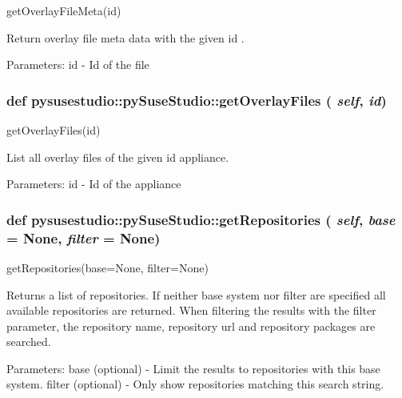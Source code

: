 \label{classpysusestudio_1_1py_suse_studio_a18433f6c2be7dd749e2d7999e28b14f6}
\begin{DoxyVerb}getOverlayFileMeta(id)

        Return overlay file meta data with the given id .
        
            Parameters:
id - Id of the file

\end{DoxyVerb}
 \hypertarget{classpysusestudio_1_1py_suse_studio_a9af6672216c4ce9c3684433b83b19a8e}{
\subsubsection[{getOverlayFiles}]{\setlength{\rightskip}{0pt plus 5cm}def pysusestudio::pySuseStudio::getOverlayFiles ( {\em self}, \/   {\em id})}}
\label{classpysusestudio_1_1py_suse_studio_a9af6672216c4ce9c3684433b83b19a8e}
\begin{DoxyVerb}getOverlayFiles(id)

        List all overlay files of the given id appliance.
        
            Parameters:
id - Id of the appliance

\end{DoxyVerb}
 \hypertarget{classpysusestudio_1_1py_suse_studio_aa9ac2b217553d0e92c065a023ecb159b}{
\subsubsection[{getRepositories}]{\setlength{\rightskip}{0pt plus 5cm}def pysusestudio::pySuseStudio::getRepositories ( {\em self}, \/   {\em base} = {\ttfamily None}, \/   {\em filter} = {\ttfamily None})}}
\label{classpysusestudio_1_1py_suse_studio_aa9ac2b217553d0e92c065a023ecb159b}
\begin{DoxyVerb}getRepositories(base=None, filter=None)

        Returns a list of repositories. If neither base system nor filter are speciﬁed all available repositories 
        are returned. 
        When ﬁltering the results with the filter parameter, the repository name, repository url and repository 
        packages are searched.
        
            Parameters:
base (optional) - Limit the results to repositories with this base system. 
filter (optional) - Only show repositories matching this search string.

\end{DoxyVerb}
